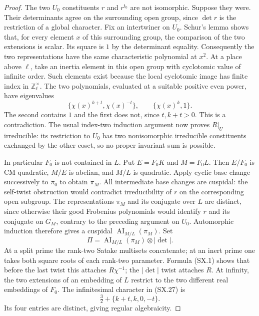 \begin{proof}
The two $U_0$ constituents $r$ and $r^{t_0}$ are not isomorphic.
Suppose they were.  Their determinants agree on the surrounding
open group, since $\det r$ is the restriction of a global
character.  Fix an intertwiner on $U_0$.  Schur's lemma shows
that, for every element $x$ of this surrounding group, the
comparison of the two extensions is scalar.  Its square is
$1$ by the determinant equality.  Consequently the two
representations have the same characteristic polynomial at
$x^2$.  At a place above $\ell$, take an inertia element in
this open group with cyclotomic value of infinite order.
Such elements exist because the local cyclotomic image has
finite index in $\mathbb Z_\ell^\times$.
The two polynomials, evaluated at a suitable positive even
power, have eigenvalues
\[
     \{\chi(x)^{k+t},\chi(x)^{-t}\},\qquad
     \{\chi(x)^k,1\}.
\]
The second contains $1$ and the first does not, since
$t,k+t>0$.  This is a contradiction.  The usual index-two
induction argument now proves $R|_U$ irreducible: its restriction
to $U_0$ has two nonisomorphic irreducible constituents exchanged
by the other coset, so no proper invariant sum is possible.

In particular $F_0$ is not contained in $L$.  Put
$E=F_0K$ and $M=F_0L$.  Then $E/F_0$ is CM quadratic,
$M/E$ is abelian, and $M/L$ is quadratic.
Apply cyclic base change successively to $\pi_0$ to obtain
$\pi_M$.  All intermediate base changes are cuspidal:
the self-twist obstruction would contradict irreducibility of
$r$ on the corresponding open subgroup.  The representations
$\pi_M$ and its conjugate over $L$ are distinct, since otherwise
their good Frobenius polynomials would identify $r$ and its
conjugate on $G_M$, contrary to the preceding argument on
$U_0$.  Automorphic induction therefore gives a cuspidal
$\operatorname{AI}_{M/L}(\pi_M)$.
Set
\[
             \Pi=\operatorname{AI}_{M/L}(\pi_M)
                                      \otimes|\det|.          \tag{SX.27}
\]
At a split prime the rank-two Satake multisets concatenate;
at an inert prime one takes both square roots of each
rank-two parameter.  Formula (SX.1) shows that before the
last twist this attaches $R\chi^{-1}$; the $|\det|$ twist
attaches $R$.  At infinity, the two extensions of an embedding
of $L$ restrict to the two different real embeddings of $F_0$.
The infinitesimal character in (SX.27) is
\[
               \tfrac32+\{k+t,k,0,-t\}.
\]
Its four entries are distinct, giving regular algebraicity.


\end{proof}
